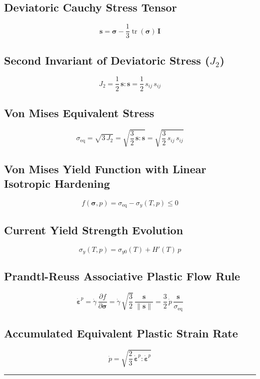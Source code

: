 \documentclass[10pt,a4paper]{article}
\begin{document}
\subsection*{Deviatoric Cauchy Stress Tensor}
\[
\mathbf{s} = \boldsymbol{\sigma} - \frac{1}{3}\operatorname{tr}(\boldsymbol{\sigma})\,\mathbf{I}
\]

\subsection*{Second Invariant of Deviatoric Stress ($J_2$)}
\[
J_2 = \frac{1}{2}\,\mathbf{s} : \mathbf{s} = \frac{1}{2}\,s_{ij}\,s_{ij}
\]

\subsection*{Von Mises Equivalent Stress}
\[
\sigma_{\mathrm{eq}} = \sqrt{3\,J_2} = \sqrt{\frac{3}{2}\,\mathbf{s} : \mathbf{s}} = \sqrt{\frac{3}{2}\,s_{ij}\,s_{ij}}
\]

\subsection*{Von Mises Yield Function with Linear Isotropic Hardening}
\[
f(\boldsymbol{\sigma}, p) = \sigma_{\mathrm{eq}} - \sigma_y(T, p) \le 0
\]

\subsection*{Current Yield Strength Evolution}
\[
\sigma_y(T, p) = \sigma_{y0}(T) + H'(T)\,p
\]

\subsection*{Prandtl-Reuss Associative Plastic Flow Rule}
\[
\dot{\boldsymbol{\varepsilon}}^p = \dot{\gamma}\,\frac{\partial f}{\partial \boldsymbol{\sigma}} = \dot{\gamma}\,\sqrt{\frac{3}{2}}\,\frac{\mathbf{s}}{\|\mathbf{s}\|} = \frac{3}{2}\,\dot{p}\,\frac{\mathbf{s}}{\sigma_{\mathrm{eq}}}
\]

\subsection*{Accumulated Equivalent Plastic Strain Rate}
\[
\dot{p} = \sqrt{\frac{2}{3}\,\dot{\boldsymbol{\varepsilon}}^p : \dot{\boldsymbol{\varepsilon}}^p}
\]

\clearpage
{}
\vspace{0.2em}
\hrule
\vspace{0.6em}
\end{document}
